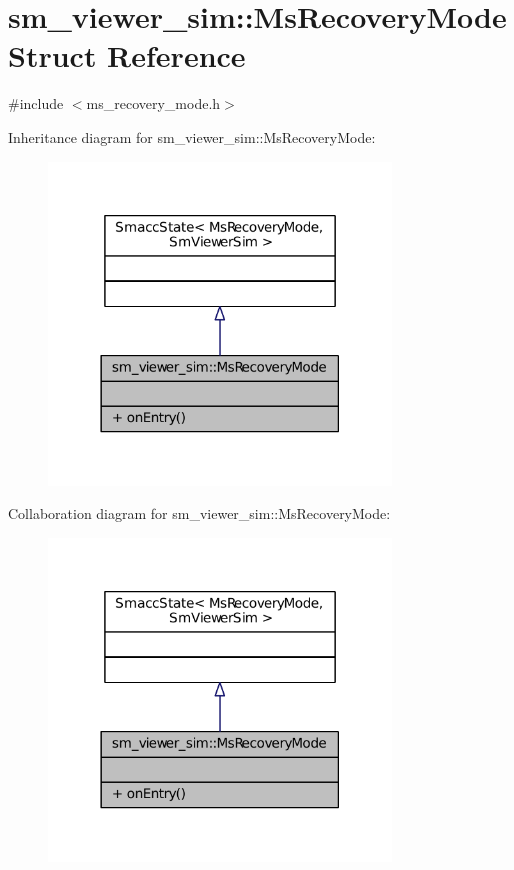 \hypertarget{structsm__viewer__sim_1_1MsRecoveryMode}{}\section{sm\+\_\+viewer\+\_\+sim\+:\+:Ms\+Recovery\+Mode Struct Reference}
\label{structsm__viewer__sim_1_1MsRecoveryMode}


{\ttfamily \#include $<$ms\+\_\+recovery\+\_\+mode.\+h$>$}



Inheritance diagram for sm\+\_\+viewer\+\_\+sim\+:\+:Ms\+Recovery\+Mode\+:
\nopagebreak
\begin{figure}[H]
\begin{center}
\leavevmode
\includegraphics[width=258pt]{structsm__viewer__sim_1_1MsRecoveryMode__inherit__graph}
\end{center}
\end{figure}


Collaboration diagram for sm\+\_\+viewer\+\_\+sim\+:\+:Ms\+Recovery\+Mode\+:
\nopagebreak
\begin{figure}[H]
\begin{center}
\leavevmode
\includegraphics[width=258pt]{structsm__viewer__sim_1_1MsRecoveryMode__coll__graph}
\end{center}
\end{figure}

